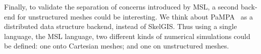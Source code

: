 Finally, to validate the separation of concerns introduced by MSL, a second back-end for unstructured meshes could be interesting. We think about PaMPA~\cite{lachat:hal-00768916} as a distributed data structure backend, instead of SkelGIS. Thus using a single language, the MSL language, two different kinds of numerical simulations could be defined: one onto Cartesian meshes; and one on unstructured meshes.



